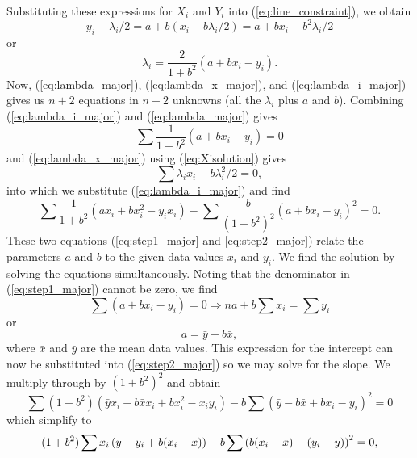 Substituting these expressions for $X_i$ and $Y_i$ into (\ref{eq:line_constraint}), we obtain
\begin{equation}
y_i + \lambda_i/2 = a + b \left (x_i - b \lambda_i/2 \right ) = a + bx_i - b^2 \lambda_i/2
\end{equation}	 
or
\begin{equation}
\lambda_i = \frac{2}{1 + b^2}\left (a + bx_i - y_i\right ).
\label{eq:lambda_i_major}
\end{equation}
Now, (\ref{eq:lambda_major}), (\ref{eq:lambda_x_major}), and (\ref{eq:lambda_i_major}) gives us
$n+2$ equations in $n+2$ unknowns (all the $\lambda_i$ plus $a$ and $b$).  Combining 
(\ref{eq:lambda_i_major}) and (\ref{eq:lambda_major}) gives
\begin{equation}
\sum	  \frac{1}{1+b^2} \left ( a + b x_i - y_i\right ) =  0
\label{eq:step1_major}
\end{equation}	
and (\ref{eq:lambda_x_major}) using (\ref{eq:Xisolution}) gives
\begin{equation}
\sum \lambda_i x_i - b\lambda ^2_i/2 = 0,
\end{equation}	 
into which we substitute (\ref{eq:lambda_i_major}) and find
\begin{equation}
\sum \frac{1}{1 + b^2}\left (ax_i + bx^2_i - y_i x_i\right ) - \sum \frac{b}{(1+b^2)^2}\left (a+bx_i - y_i\right ) ^2 = 0.
\label{eq:step2_major} 
\end{equation}
These two equations (\ref{eq:step1_major} and \ref{eq:step2_major}) relate the parameters $a$ and $b$ to the given data values $x_i$ and $y_i$.  We find 
the solution by solving the equations simultaneously.  Noting that the denominator in (\ref{eq:step1_major}) cannot be zero, we find
\begin{equation}
\sum (a+ b x_i - y_i) = 0 \Rightarrow na + b \sum x_i = \sum y_i
\end{equation}	 
or
\begin{equation}
a = \bar{y} - b \bar{x},
\end{equation}
where $\bar{x}$  and $\bar{y}$ are the mean data values.  This expression for the intercept can now be substituted into 
(\ref{eq:step2_major}) so we may solve for the slope.  We multiply through by $(1 + b^2)^2$ and obtain
\begin{equation}
\sum (1 + b^2) \left ( \bar{y}x_i - b \bar{x} x_i + b x^2_i - x_i y_i \right ) -b \sum  \left ( \bar{y} - b \bar{x} + b x_i - y_i\right ) ^2 = 0
\end{equation}
which simplify to
\begin{equation}
\displaystyle (1 + b^2) \sum x_i \left ( \bar{y} - y_i + b (x_i - \bar{x}) \right ) -b \sum \left ( b ( x_i - \bar{x}) - (y_i - \bar{y})\right ) ^2 = 0,\\*[2ex]
\end{equation}
